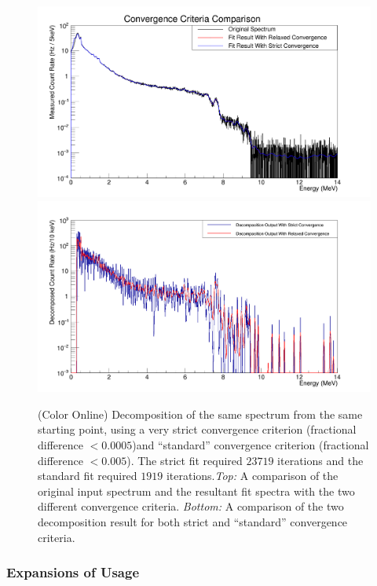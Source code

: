 \documentclass[5p]{elsarticle}
\begin{document}
\begin{figure}[h]
\begin{center}
\includegraphics[width=\linewidth]{Conv_Fit_Comp_png}
\includegraphics[width=\linewidth]{Conv_Decomp_Comp_png}
\caption{(Color Online) Decomposition of the same spectrum from the same starting point, using a very strict convergence criterion (fractional difference $< 0.0005$)and ``standard'' convergence criterion (fractional difference $< 0.005$).  The strict fit required $23719$ iterations and the standard fit required $1919$ iterations.\emph{Top:} A comparison of the original input spectrum and the resultant fit spectra with the two different convergence criteria. \emph{Bottom:} A comparison of the two decomposition result for both strict and ``standard'' convergence criteria.}
\label{fig-convergence-criteria}
\end{center}
\end{figure}

\subsubsection{Expansions of Usage}
\end{document}
